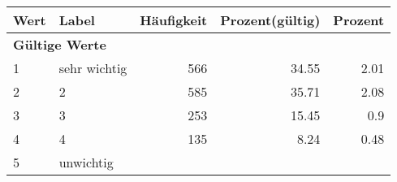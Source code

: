      \begin{longtable}{lXrrr}
     \toprule
     \textbf{Wert} & \textbf{Label} & \textbf{Häufigkeit} & \textbf{Prozent(gültig)} & \textbf{Prozent} \\
     \endhead
     \midrule
     \multicolumn{5}{l}{\textbf{Gültige Werte}}\\

     1 &
     \multicolumn{1}{X}{ sehr wichtig   } &


       \num{566} &
       \num[round-mode=places,round-precision=2]{34.55} &
         \num[round-mode=places,round-precision=2]{2.01} \\

     2 &
     \multicolumn{1}{X}{ 2   } &


       \num{585} &
       \num[round-mode=places,round-precision=2]{35.71} &
         \num[round-mode=places,round-precision=2]{2.08} \\

     3 &
     \multicolumn{1}{X}{ 3   } &


       \num{253} &
       \num[round-mode=places,round-precision=2]{15.45} &
         \num[round-mode=places,round-precision=2]{0.9} \\

     4 &
     \multicolumn{1}{X}{ 4   } &


       \num{135} &
       \num[round-mode=places,round-precision=2]{8.24} &
         \num[round-mode=places,round-precision=2]{0.48} \\

     5 &
     \multicolumn{1}{X}{ unwichtig   } &



\end{longtable}
